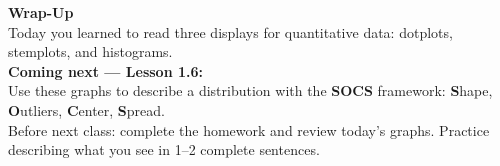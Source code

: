 \documentclass[aspectratio=169, 11pt]{beamer}
\begin{document}
{
\begin{frame}[plain]
  \vspace{1.8cm}
  \hspace{0.55cm}%
  \begin{minipage}{0.9\textwidth}
    {\color{goldacc}\bfseries\large Wrap-Up}\\[0.5cm]
    {\color{white}\normalsize
    Today you learned to read three displays for quantitative data:
    dotplots, stemplots, and histograms.}\\[0.4cm]
    {\color{skymid}\normalsize
    \textbf{Coming next --- Lesson 1.6:}\\
    Use these graphs to describe a distribution with the
    \textbf{SOCS} framework: \textbf{S}hape, \textbf{O}utliers,
    \textbf{C}enter, \textbf{S}pread.}\\[0.4cm]
    {\color{white!80!black}\small
    Before next class: complete the homework and review today's graphs.
    Practice describing what you see in 1--2 complete sentences.}
  \end{minipage}
\end{frame}
}
\end{document}
